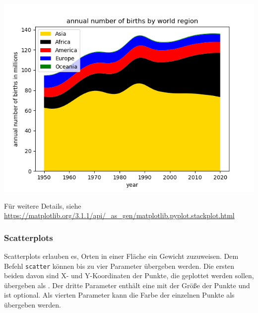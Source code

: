 \begin{tcolorbox}[title=Ausgabe: Stackplot]
\begin{center}
	\includegraphics[width=.8\linewidth]{./gfx/plt-stackplot}
\end{center}
\end{tcolorbox}

Für weitere Details, siehe \url{https://matplotlib.org/3.1.1/api/_as_gen/matplotlib.pyplot.stackplot.html}


\subsubsection{Scatterplots}
Scatterplots erlauben es, Orten in einer Fläche ein Gewicht zuzuweisen. Dem Befehl \texttt{scatter} können bis zu vier Parameter übergeben werden. Die ersten beiden davon sind X- und Y-Koordinaten der Punkte, die geplottet werden sollen, übergeben als . Der dritte Parameter enthält eine  mit der Größe der Punkte und ist optional. Als vierten Parameter kann die Farbe der einzelnen Punkte als  übergeben werden.

